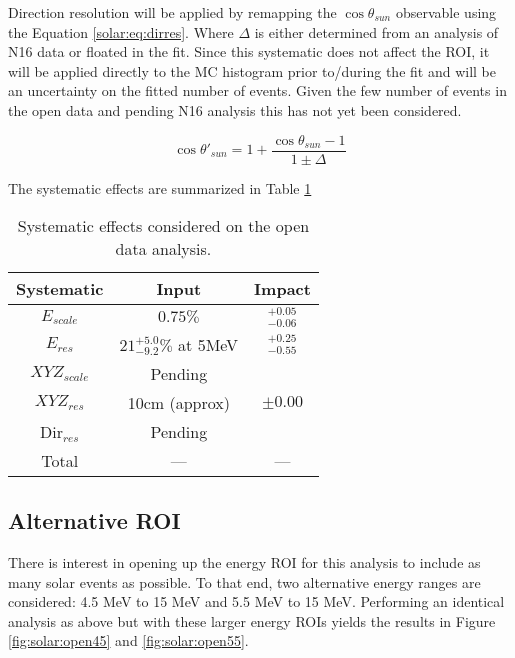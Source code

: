Direction resolution will be applied by remapping the $\cos{\theta_{sun}}$ 
observable using the Equation \ref{solar:eq:dirres}. Where $\Delta$ is either
determined from an analysis of N16 data or floated in the fit. Since this 
systematic does not affect the ROI, it will be applied directly to the MC 
histogram prior to/during the fit and will be an uncertainty on the fitted
number of events. Given the few number of events in the open data and pending
N16 analysis this has not yet been considered.

\begin{equation}
\cos{\theta'_{sun}} = 1 + \frac{\cos{\theta_{sun}}-1}{1\pm\Delta}
\label{solar:eq:dirres}
\end{equation}

The systematic effects are summarized in Table \ref{tbl:solar:systben}

\begin{table}[]
\begin{center}
\begin{tabular}{c|c|c}
Systematic & Input & Impact \\ \hline
$E_{scale}$		& $0.75\%$ & $^{+0.05}_{-0.06}$  \rule{0pt}{2.6ex}\rule[-1.2ex]{0pt}{0pt}  \\
$E_{res}$		& $21^{+5.0}_{-9.2}\%$ at 5MeV & $^{+0.25}_{-0.55}$  \rule{0pt}{2.6ex}\rule[-1.2ex]{0pt}{0pt}  \\
${XYZ}_{scale}$	& Pending &  \rule{0pt}{2.6ex}\rule[-1.2ex]{0pt}{0pt}  \\
${XYZ}_{res}$		& 10cm (approx) & $\pm0.00$  \rule{0pt}{2.6ex}\rule[-1.2ex]{0pt}{0pt}  \\
Dir$_{res}$ 	& Pending & \rule{0pt}{2.6ex}\rule[-1.2ex]{0pt}{0pt}  \\ \hline
Total			& --- &  --- \rule{0pt}{2.6ex}\rule[-1.2ex]{0pt}{0pt}  
\end{tabular}
\caption{Systematic effects considered on the open data analysis.}
\label{tbl:solar:systben}
\end{center}
\end{table}

\subsection{Alternative ROI}

There is interest in opening up the energy ROI for this analysis to include as many solar events as possible.
To that end, two alternative energy ranges are considered: 4.5 MeV to 15 MeV and 5.5 MeV to 15 MeV.
Performing an identical analysis as above but with these larger energy ROIs yields the results in Figure \ref{fig:solar:open45} and \ref{fig:solar:open55}.

